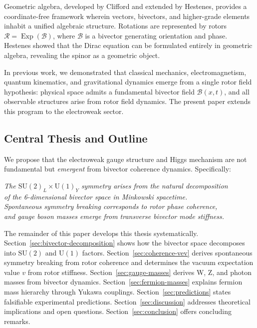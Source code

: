 \documentclass[11pt,a4paper]{article}
\newcommand{\Exp}{\operatorname{Exp}}
\newcommand{\Rotor}{\mathcal{R}}
\newcommand{\Biv}{\mathcal{B}}
\newcommand{\SU}{\mathrm{SU}}
\newcommand{\U}{\mathrm{U}}
\theoremstyle{definition}
\theoremstyle{plain}
\theoremstyle{remark}
\begin{document}
Geometric algebra, developed by Clifford and extended by Hestenes, provides a coordinate-free framework wherein vectors, bivectors, and higher-grade elements inhabit a unified algebraic structure. Rotations are represented by rotors $\Rotor = \Exp(\Biv)$, where $\Biv$ is a bivector generating orientation and phase. Hestenes showed that the Dirac equation can be formulated entirely in geometric algebra, revealing the spinor as a geometric object.

In previous work, we demonstrated that classical mechanics, electromagnetism, quantum kinematics, and gravitational dynamics emerge from a single rotor field hypothesis: physical space admits a fundamental bivector field $\Biv(x,t)$, and all observable structures arise from rotor field dynamics. The present paper extends this program to the electroweak sector.

\subsection{Central Thesis and Outline}

We propose that the electroweak gauge structure and Higgs mechanism are not fundamental but \emph{emergent} from bivector coherence dynamics. Specifically:

\begin{center}
\textit{The $\SU(2)_L \times \U(1)_Y$ symmetry arises from the natural decomposition \\
of the 6-dimensional bivector space in Minkowski spacetime. \\
Spontaneous symmetry breaking corresponds to rotor phase coherence, \\
and gauge boson masses emerge from transverse bivector mode stiffness.}
\end{center}

The remainder of this paper develops this thesis systematically. Section~\ref{sec:bivector-decomposition} shows how the bivector space decomposes into $\SU(2)$ and $\U(1)$ factors. Section~\ref{sec:coherence-vev} derives spontaneous symmetry breaking from rotor coherence and determines the vacuum expectation value $v$ from rotor stiffness. Section~\ref{sec:gauge-masses} derives W, Z, and photon masses from bivector dynamics. Section~\ref{sec:fermion-masses} explains fermion mass hierarchy through Yukawa couplings. Section~\ref{sec:predictions} states falsifiable experimental predictions. Section~\ref{sec:discussion} addresses theoretical implications and open questions. Section~\ref{sec:conclusion} offers concluding remarks.
\end{document}
